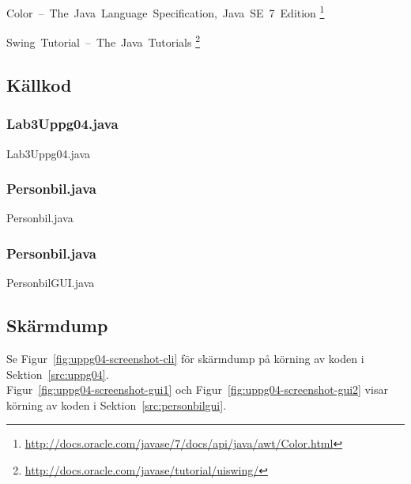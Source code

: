 \mbox{Color -- The Java Language Specification, Java SE 7 Edition}
\footnote{\url{http://docs.oracle.com/javase/7/docs/api/java/awt/Color.html}}

\mbox{Swing Tutorial -- The Java Tutorials}
\footnote{\url{http://docs.oracle.com/javase/tutorial/uiswing/}}


\subsection{Källkod}
\subsubsection{Lab3Uppg04.java}
\caption{Lab3Uppg04.java}
\label{src:uppg04}

\subsubsection{Personbil.java}
\caption{Personbil.java}
\label{src:personbil}

\subsubsection{Personbil.java}
\caption{PersonbilGUI.java}
\label{src:personbilgui}


\subsection{Skärmdump}
Se Figur~\ref{fig:uppg04-screenshot-cli} för skärmdump på körning av koden i 
Sektion~\ref{src:uppg04}.
\\
Figur~\ref{fig:uppg04-screenshot-gui1} och Figur~\ref{fig:uppg04-screenshot-gui2} 
visar körning av koden i Sektion~\ref{src:personbilgui}.

